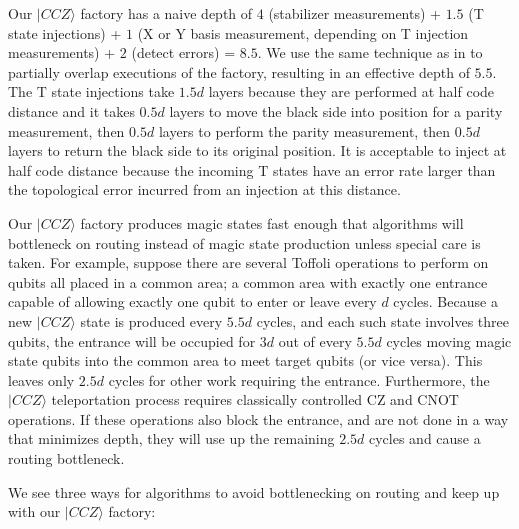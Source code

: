 \documentclass[superscriptaddress,notitlepage,longbibliography]{revtex4-1}
\begin{document}
Our $|CCZ\rangle$ factory has a naive depth of $4$ (stabilizer measurements) + $1.5$ (T state injections) + $1$ (X or Y basis measurement, depending on T injection measurements) + $2$ (detect errors) = $8.5$.
We use the same technique as in \cite{fowler2018} to partially overlap executions of the factory, resulting in an effective depth of $5.5$.
The T state injections take $1.5d$ layers because they are performed at half code distance and it takes $0.5d$ layers to move the black side into position for a parity measurement, then $0.5d$ layers to perform the parity measurement, then $0.5d$ layers to return the black side to its original position.
It is acceptable to inject at half code distance because the incoming T states have an error rate larger than the topological error incurred from an injection at this distance.

Our $|CCZ\rangle$ factory produces magic states fast enough that algorithms will bottleneck on routing instead of magic state production unless special care is taken.
For example, suppose there are several Toffoli operations to perform on qubits all placed in a common area; a common area with exactly one entrance capable of allowing exactly one qubit to enter or leave every $d$ cycles.
Because a new $|CCZ\rangle$ state is produced every $5.5d$ cycles, and each such state involves three qubits, the entrance will be occupied for $3d$ out of every $5.5d$ cycles moving magic state qubits into the common area to meet target qubits (or vice versa). This leaves only $2.5d$ cycles for other work requiring the entrance.
Furthermore, the $|CCZ\rangle$ teleportation process requires classically controlled CZ and CNOT operations.
If these operations also block the entrance, and are not done in a way that minimizes depth, they will use up the remaining $2.5d$ cycles and cause a routing bottleneck.

We see three ways for algorithms to avoid bottlenecking on routing and keep up with our $|CCZ\rangle$ factory:
\end{document}
